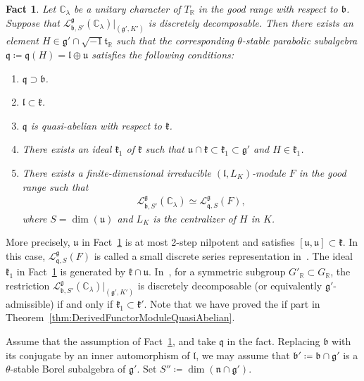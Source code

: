 \documentclass[10pt,a4paper]{amsart}
\numberwithin{equation}{section}
\newtheorem{Fact}[Theorem]{Fact}
\theoremstyle{definition}
\newcommand{\BasicRing}[1]{\mathbb{#1}}
\newcommand{\RR}{\BasicRing{R}}
\newcommand{\CC}{\BasicRing{C}}
\newcommand{\lie}[1]{\mathfrak{#1}}
\newcommand{\lmod}[3]{\mathcal{L}^{\lie{#1}}_{\lie{#2}, #3}}
\begin{document}
\begin{Fact}\label{fact:DiscDecompDiscSeries}
	Let $\CC_{\lambda}$ be a unitary character of $T_{\RR}$ in the good range with respect to $\lie{b}$.
	Suppose that $\lmod{g}{b}{S'}(\CC_{\lambda})|_{(\lie{g}', K')}$ is discretely decomposable.
	Then there exists an element $H \in \lie{g}' \cap \sqrt{-1}\lie{t}_\RR$ such that
	the corresponding $\theta$-stable parabolic subalgebra $\lie{q}\coloneq \lie{q}(H) = \lie{l}\oplus \lie{u}$
	satisfies the following conditions:
	\begin{enumerate}\itemsep=0pt
		\item[$1.$] $\lie{q} \supset \lie{b}$.
		\item[$2.$] $\lie{l}\subset \lie{k}$.
		\item[$3.$] $\lie{q}$ is quasi-abelian with respect to $\lie{k}$.
		\item[$4.$] There exists an ideal $\lie{k}_1$ of $\lie{k}$ such that
		$\lie{u} \cap \lie{k} \subset \lie{k}_1\subset \lie{g}'$ and $H \in \lie{k}_1$.
		\item[$5.$]%
There exists a finite-dimensional irreducible $(\lie{l}, L_K)$-module $F$ in the good range such that
		\begin{align*}
			\lmod{g}{b}{S'}(\CC_{\lambda}) \simeq \lmod{g}{q}{S}(F),
		\end{align*}
		where $S=\dim(\lie{u})$ and $L_K$ is the centralizer of $H$ in $K$.
	\end{enumerate}
\end{Fact}

More precisely, $\lie{u}$ in Fact~\ref{fact:DiscDecompDiscSeries} is at most 2-step nilpotent and satisfies $[\lie{u}, \lie{u}]\subset \lie{k}$.
In this case, $\lmod{g}{q}{S}(F)$ is called a small discrete series representation in~\cite{GrWa00}.
The ideal $\lie{k}_1$ in Fact~\ref{fact:DiscDecompDiscSeries} is generated by $\lie{k}\cap \lie{u}$.
In~\cite[Corollary~1]{DuVa10}, for a symmetric subgroup $G'_\RR\subset G_\RR$, the restriction $\lmod{g}{b}{S'}(\CC_{\lambda})|_{(\lie{g}', K')}$ is discretely decomposable (or equivalently $\lie{g'}$-admissible) if and only if $\lie{k}_1\subset \lie{k}'$.
Note that we have proved the if part in Theorem~\ref{thm:DerivedFunctorModuleQuasiAbelian}.

Assume that the assumption of Fact~\ref{fact:DiscDecompDiscSeries}, and take $\lie{q}$ in the fact.
Replacing $\lie{b}$ with its conjugate by an inner automorphism of $\lie{l}$, we may assume that $\lie{b'}\coloneq \lie{b}\cap \lie{g'}$ is a $\theta$-stable Borel subalgebra of $\lie{g'}$.
Set $S''\coloneq \dim(\lie{n} \cap \lie{g'})$.
\end{document}
